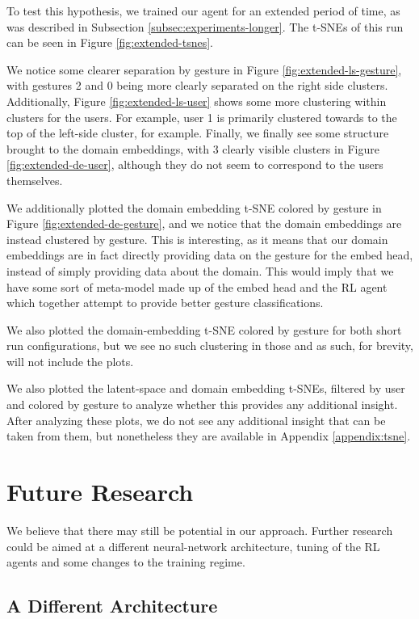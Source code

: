 To test this hypothesis, we trained our agent for an extended period of time, as was described in Subsection \ref{subsec:experiments-longer}.
The t-SNEs of this run can be seen in Figure \ref{fig:extended-tsnes}.

We notice some clearer separation by gesture in Figure \ref{fig:extended-ls-gesture}, with gestures 2 and 0 being more clearly separated on the right side clusters.
Additionally, Figure \ref{fig:extended-ls-user} shows some more clustering within clusters for the users. For example, user 1 is primarily clustered towards to the top of the left-side cluster, for example.
Finally, we finally see some structure brought to the domain embeddings, with 3 clearly visible clusters in Figure \ref{fig:extended-de-user}, although they do not seem to correspond to the users themselves.

We additionally plotted the domain embedding t-SNE colored by gesture in Figure \ref{fig:extended-de-gesture}, and we notice that the domain embeddings are instead clustered by gesture.
This is interesting, as it means that our domain embeddings are in fact directly providing data on the gesture for the embed head, instead of simply providing data about the domain.
This would imply that we have some sort of meta-model made up of the embed head and the RL agent which together attempt to provide better gesture classifications.

We also plotted the domain-embedding t-SNE colored by gesture for both short run configurations, but we see no such clustering in those and as such, for brevity, will not include the plots.

We also plotted the latent-space and domain embedding t-SNEs, filtered by user and colored by gesture to analyze whether this provides any additional insight.
After analyzing these plots, we do not see any additional insight that can be taken from them, but nonetheless they are available in Appendix \ref{appendix:tsne}.

\section{Future Research}

We believe that there may still be potential in our approach.
Further research could be aimed at a different neural-network architecture, tuning of the RL agents and some changes to the training regime.

\subsection{A Different Architecture}

